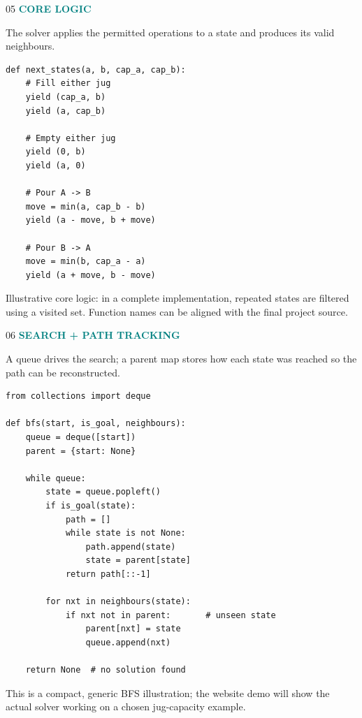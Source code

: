 \documentclass[aspectratio=169,10pt]{beamer}
\newcommand{\slideheading}[2]{%
  {\fontfamily{phv}\fontseries{b}\selectfont\textcolor{DeepNavy}{#1}}%
  \hspace{0.16cm}{\fontfamily{phv}\fontseries{m}\selectfont\textcolor{Teal}{/}}%
  \hspace{0.16cm}{\fontfamily{phv}\fontseries{b}\selectfont\textcolor{DeepNavy}{#2}}%
}
\newcommand{\smalllabel}[1]{\textcolor{Teal}{\bfseries\scriptsize #1}}
\begin{document}
\begin{frame}[fragile]{\slideheading{05}{Implementation: valid jug operations}}
  \smalllabel{CORE LOGIC}\par\vspace{0.08cm}
  The solver applies the permitted operations to a state and produces its valid neighbours.
  \vspace{0.06cm}
  \begin{lstlisting}
def next_states(a, b, cap_a, cap_b):
    # Fill either jug
    yield (cap_a, b)
    yield (a, cap_b)

    # Empty either jug
    yield (0, b)
    yield (a, 0)

    # Pour A -> B
    move = min(a, cap_b - b)
    yield (a - move, b + move)

    # Pour B -> A
    move = min(b, cap_a - a)
    yield (a + move, b - move)
  \end{lstlisting}
  \vspace{0.1cm}
  {\scriptsize\color{Muted}Illustrative core logic: in a complete implementation, repeated states are filtered using a visited set. Function names can be aligned with the final project source.}
\end{frame}

\begin{frame}[fragile]{\slideheading{06}{Implementation: BFS solver}}
  \smalllabel{SEARCH + PATH TRACKING}\par\vspace{0.08cm}
  A queue drives the search; a parent map stores how each state was reached so the path can be reconstructed.
  \vspace{0.04cm}
  \begin{lstlisting}
from collections import deque

def bfs(start, is_goal, neighbours):
    queue = deque([start])
    parent = {start: None}

    while queue:
        state = queue.popleft()
        if is_goal(state):
            path = []
            while state is not None:
                path.append(state)
                state = parent[state]
            return path[::-1]

        for nxt in neighbours(state):
            if nxt not in parent:       # unseen state
                parent[nxt] = state
                queue.append(nxt)

    return None  # no solution found
  \end{lstlisting}
  \vspace{0.02cm}
  {\tiny\color{Muted}This is a compact, generic BFS illustration; the website demo will show the actual solver working on a chosen jug-capacity example.}
\end{frame}
\end{document}
